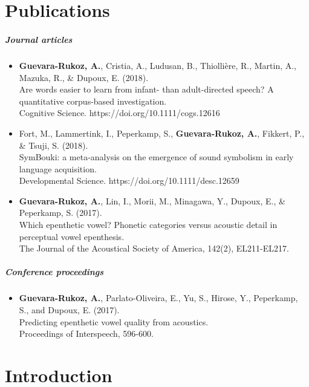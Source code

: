 \documentclass[12pt, twoside]{report}
\begin{document}
\chapter*{Publications}

\paragraph{Journal articles}
\begin{itemize}
\item \textbf{Guevara-Rukoz, A.}, Cristia, A., Ludusan, B., Thiollière, R., Martin, A., Mazuka, R., \& Dupoux, E. (2018). \\
  Are words easier to learn from infant- than adult-directed speech? A quantitative corpus-based investigation. \\
  Cognitive Science. https://doi.org/10.1111/cogs.12616
\item Fort, M., Lammertink, I., Peperkamp, S., \textbf{Guevara-Rukoz, A.}, Fikkert, P., \& Tsuji, S. (2018). \\
  SymBouki: a meta-analysis on the emergence of sound symbolism in early language acquisition. \\
  Developmental Science. https://doi.org/10.1111/desc.12659
\item \textbf{Guevara-Rukoz, A.}, Lin, I., Morii, M., Minagawa, Y., Dupoux, E., \& Peperkamp, S. (2017). \\
  Which epenthetic vowel? Phonetic categories versus acoustic detail in perceptual vowel epenthesis. \\
  The Journal of the Acoustical Society of America, 142(2), EL211-EL217.
\end{itemize}
\paragraph{Conference proceedings}
\begin{itemize}
\item \textbf{Guevara-Rukoz, A.}, Parlato-Oliveira, E., Yu, S., Hirose, Y., Peperkamp, S., and Dupoux, E. (2017). \\
  Predicting epenthetic vowel quality from acoustics. \\
  Proceedings of Interspeech, 596-600.
\end{itemize}

\tableofcontents
\linenumbers
\chapter{Introduction}
\setcounter{page}{1}

\end{document}
